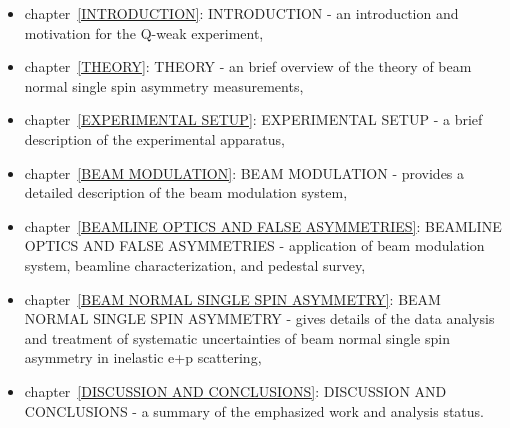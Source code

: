 \begin{itemize}
\doublespacing
\item chapter~\ref{INTRODUCTION}: INTRODUCTION - an introduction and motivation for the Q-weak experiment,
\item chapter~\ref{THEORY}: THEORY - an brief overview of the theory of beam normal single spin asymmetry measurements,
\item chapter~\ref{EXPERIMENTAL SETUP}: EXPERIMENTAL SETUP - a brief description of the experimental apparatus,
\item chapter~\ref{BEAM MODULATION}: BEAM MODULATION - provides a detailed description of the beam modulation system,
\item chapter~\ref{BEAMLINE OPTICS AND FALSE ASYMMETRIES}: BEAMLINE OPTICS AND FALSE ASYMMETRIES - application of beam modulation system, beamline characterization, and pedestal survey,
\item chapter~\ref{BEAM NORMAL SINGLE SPIN ASYMMETRY}: BEAM NORMAL SINGLE SPIN ASYMMETRY - gives details of the data analysis and treatment of systematic uncertainties of beam normal single spin asymmetry in inelastic e+p scattering,
\item chapter~\ref{DISCUSSION AND CONCLUSIONS}: DISCUSSION AND CONCLUSIONS - a summary of the emphasized work and analysis status.
\end{itemize}



